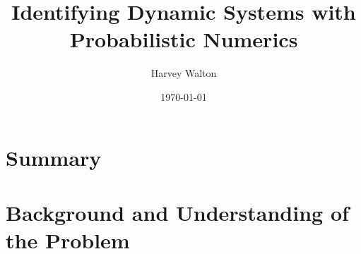 \documentclass[12pt]{article}
\title{Identifying Dynamic Systems with Probabilistic Numerics}
\author{Harvey Walton}
\date{\today}
\begin{document}

    \thispagestyle{empty}
    

    \section{Summary}

    \printnomenclature

    \newpage
    \tableofcontents
    \newpage


    \section{Background and Understanding of the Problem}
\end{document}
